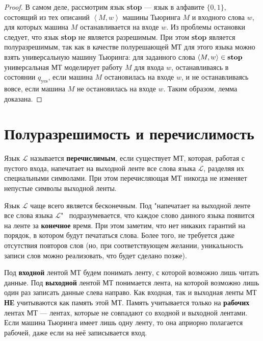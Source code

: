 \documentclass[11pt]{article}
\begin{document}
\begin{proof}
    В самом деле, рассмотрим язык \textbf{stop} --- язык в алфавите $\{0, 1\}$, состоящий из тех описаний $\left\langle M, w \right\rangle$ машины Тьюринга $M$ и входного слова $w$, для которых машина $M$ останавливается на входе $w$. Из проблемы остановки следует, что язык \textbf{stop} не является разрешимым. При этом \textbf{stop} является полуразрешимым, так как в качестве полурешающей МТ для этого языка можно взять универсальную машину Тьюринга: для заданного слова $\left\langle M, w \right\rangle \in \text{\textbf{stop}}$ универсальная МТ моделирует работу $M$ для входа $w$, останавливаясь в состоянии $q_{\text{yes}}$, если машина $M$ остановилась на входе $w$, и не останавливаясь вовсе, если машина $M$ не остановилась на входе $w$. Таким образом, лемма доказана.
\end{proof}

\section{Полуразрешимость и перечислимость}

\begin{definition}
    Язык $\mathcal{L}$ называется \textbf{перечислимым}, если существует МТ, которая, работая с пустого входа, напечатает на выходной ленте все слова языка $\mathcal{L}$, разделяя их специальными символами. При этом перечисляющая МТ никогда не изменяет непустые символы выходной ленты.
\end{definition}

\begin{remark}
    Язык $\mathcal{L}$ чаще всего является бесконечным. Под "напечатает на выходной ленте все слова языка $\mathcal{L}$" \, подразумевается, что каждое слово данного языка появится на ленте за \textbf{конечное} время. При этом заметим, что нет никаких гарантий на порядок, в котором будут печататься слова. Более того, не требуется даже отсутствия повторов слов (но, при соответствующем желании, уникальность записи слов можно реализовать, что будет сделано позже).
\end{remark}

\begin{remark}
    Под \textbf{входной} лентой МТ будем понимать ленту, с которой возможно лишь читать данные. Под \textbf{выходной} лентой МТ понимается лента, на которой возможно лишь один раз записать данные слева направо. Как входная, так и выходная ленты МТ \textbf{НЕ} учитываются как память этой МТ. Память учитывается только на \textbf{рабочих} лентах МТ --- лентах, которые не совпадают со входной и выходной лентами. Если машина Тьюринга имеет лишь одну ленту, то она априорно полагается рабочей, даже если на неё записывается вход. 
\end{remark}
\end{document}
